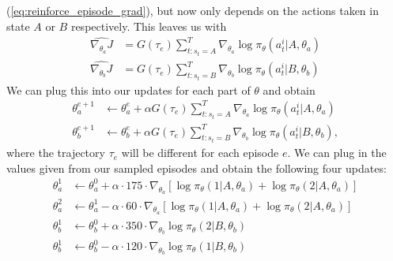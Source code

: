 \documentclass{article}
\begin{document}
\begin{enumerate}
\begin{enumerate}
		            (\ref{eq:reinforce_episode_grad}), but now only depends on the actions taken in
		            state $A$ or $B$ respectively. This leaves us with
		            \begin{align}
			            \widehat{\nabla_{\theta_a} J} & = G(\tau_e) \sum_{t : s_t = A}^T\nabla_{\theta_a}
			            \log \pi_\theta(a_t^i| A, \theta_a)                                               \\
			            \widehat{\nabla_{\theta_b} J} & = G(\tau_e) \sum_{t : s_t = B}^T\nabla_{\theta_b}
			            \log \pi_\theta(a_t^i| B, \theta_b)
		            \end{align}
		            We can plug this into our updates for each part of $\theta$ and obtain
		            \begin{align}
			            \theta^{e+1}_a & \leftarrow \theta^e_a + \alpha G(\tau_e) \sum_{t : s_t
				            = A}^T\nabla_{\theta_a} \log \pi_\theta(a_t^i| A, \theta_a)
			            \label{eq:reinforce_a_update}                                           \\
			            \theta^{e+1}_b & \leftarrow \theta^e_b + \alpha G(\tau_e) \sum_{t : s_t
				            = B}^T\nabla_{\theta_b} \log \pi_\theta(a_t^i| B,
			            \theta_b),\label{eq:reinforce_b_update}
		            \end{align}
		            where the trajectory $\tau_e$ will be different for each episode $e$. We can plug in the
		            values given from our sampled episodes and obtain the following four updates:
		            \begin{align}
			            \theta^1_a & \leftarrow \theta^0_a + \alpha \cdot 175 \cdot
			            \nabla_{\theta_a}\left[ \log \pi_\theta(1| A, \theta_a) + \log \pi_\theta(2|
			            A, \theta_a)\right]                                         \\
			            \theta^2_a & \leftarrow \theta^1_a - \alpha \cdot 60 \cdot
			            \nabla_{\theta_a}\left[ \log \pi_\theta(1| A, \theta_a) + \log \pi_\theta(2|
			            A, \theta_a)\right]                                         \\
			            \theta^1_b & \leftarrow \theta^0_b + \alpha \cdot 350 \cdot
			            \nabla_{\theta_b} \log \pi_\theta(2| B, \theta_b)           \\
			            \theta^1_b & \leftarrow \theta^0_b - \alpha \cdot 120 \cdot
			            \nabla_{\theta_b} \log \pi_\theta(1| B, \theta_b)
		            \end{align}

\end{enumerate}
\end{enumerate}
\end{document}
